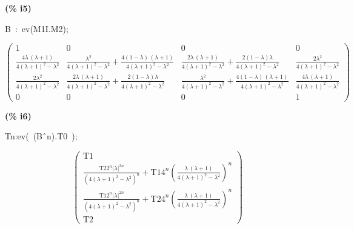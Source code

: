 \documentclass[fleqn]{article}
\begin{document}
\noindent
\begin{minipage}[t]{4.000000em}\color{red}\bfseries
(\% i5)	
\end{minipage}
\begin{minipage}[t]{\textwidth}\color{blue}
B\ :\ ev(M1I.M2);
\end{minipage}
\[\displaystyle \tag{\% o5} 
\begin{pmatrix}1 & 0 & 0 & 0\\
\frac{4 \lambda \, \left( \lambda +1\right) }{4 {{\left( \lambda +1\right) }^{2}}-{{\lambda }^{2}}} & \frac{{{\lambda }^{2}}}{4 {{\left( \lambda +1\right) }^{2}}-{{\lambda }^{2}}}+\frac{4 \left( 1-\lambda \right) \, \left( \lambda +1\right) }{4 {{\left( \lambda +1\right) }^{2}}-{{\lambda }^{2}}} & \frac{2 \lambda \, \left( \lambda +1\right) }{4 {{\left( \lambda +1\right) }^{2}}-{{\lambda }^{2}}}+\frac{2 \left( 1-\lambda \right)  \lambda }{4 {{\left( \lambda +1\right) }^{2}}-{{\lambda }^{2}}} & \frac{2 {{\lambda }^{2}}}{4 {{\left( \lambda +1\right) }^{2}}-{{\lambda }^{2}}}\\
\frac{2 {{\lambda }^{2}}}{4 {{\left( \lambda +1\right) }^{2}}-{{\lambda }^{2}}} & \frac{2 \lambda \, \left( \lambda +1\right) }{4 {{\left( \lambda +1\right) }^{2}}-{{\lambda }^{2}}}+\frac{2 \left( 1-\lambda \right)  \lambda }{4 {{\left( \lambda +1\right) }^{2}}-{{\lambda }^{2}}} & \frac{{{\lambda }^{2}}}{4 {{\left( \lambda +1\right) }^{2}}-{{\lambda }^{2}}}+\frac{4 \left( 1-\lambda \right) \, \left( \lambda +1\right) }{4 {{\left( \lambda +1\right) }^{2}}-{{\lambda }^{2}}} & \frac{4 \lambda \, \left( \lambda +1\right) }{4 {{\left( \lambda +1\right) }^{2}}-{{\lambda }^{2}}}\\
0 & 0 & 0 & 1\end{pmatrix}\mbox{}
\]


\noindent
\begin{minipage}[t]{4.000000em}\color{red}\bfseries
(\% i6)	
\end{minipage}
\begin{minipage}[t]{\textwidth}\color{blue}
Tn:ev(\ (B\^\ n).T0\ );
\end{minipage}
\[\displaystyle \tag{\% o6} 
\begin{pmatrix}\ensuremath{\mathrm{T1}}\\
\frac{\ensuremath{\mathrm{T2}} {{2}^{n}} {{\left| \lambda \right| }^{2 n}}}{{{\left( 4 {{\left( \lambda +1\right) }^{2}}-{{\lambda }^{2}}\right) }^{n}}}+\ensuremath{\mathrm{T1}} {{4}^{n}} {{\left( \frac{\lambda \, \left( \lambda +1\right) }{4 {{\left( \lambda +1\right) }^{2}}-{{\lambda }^{2}}}\right) }^{n}}\\
\frac{\ensuremath{\mathrm{T1}} {{2}^{n}} {{\left| \lambda \right| }^{2 n}}}{{{\left( 4 {{\left( \lambda +1\right) }^{2}}-{{\lambda }^{2}}\right) }^{n}}}+\ensuremath{\mathrm{T2}} {{4}^{n}} {{\left( \frac{\lambda \, \left( \lambda +1\right) }{4 {{\left( \lambda +1\right) }^{2}}-{{\lambda }^{2}}}\right) }^{n}}\\
\ensuremath{\mathrm{T2}}\end{pmatrix}\mbox{}
\]
\end{document}

